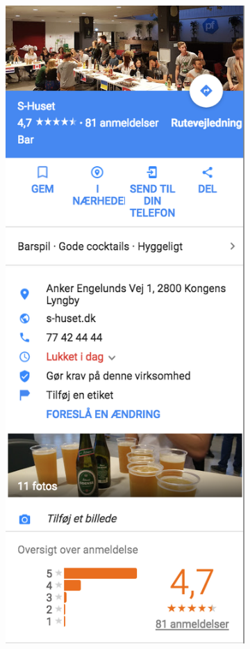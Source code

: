 \begin{figure}[H]
\centering
    \begin{subfigure}{0.32\textwidth}
    \centering
    \includegraphics[width=0.8\linewidth]{images/GoogleReview.png} 

\end{subfigure}
\end{figure}
